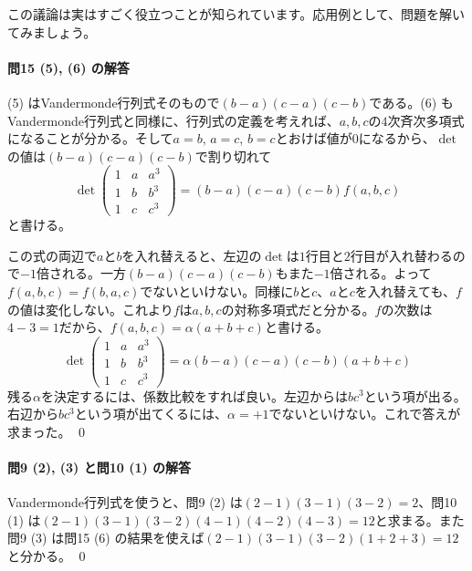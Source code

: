 この議論は実はすごく役立つことが知られています。応用例として、問題を解いてみましょう。

\paragraph{問15 (5), (6) の解答} (5) はVandermonde行列式そのもので$(b - a)(c - a)(c - b)$である。(6) もVandermonde行列式と同様に、行列式の定義を考えれば、$a, b, c$の$4$次斉次多項式になることが分かる。そして$a = b$, $a = c$, $b = c$とおけば値が$0$になるから、$\det$の値は$(b - a)(c - a)(c - b)$で割り切れて
\[
\det
\begin{pmatrix}
1 & a & a^3 \\
1 & b & b^3 \\
1 & c & c^3
\end{pmatrix}
= (b - a)(c - a)(c - b)f(a, b, c)
\]
と書ける。

この式の両辺で$a$と$b$を入れ替えると、左辺の$\det$は$1$行目と$2$行目が入れ替わるので$-1$倍される。一方$(b - a)(c - a)(c - b)$もまた$-1$倍される。よって$f(a, b, c) = f(b, a, c)$でないといけない。同様に$b$と$c$、$a$と$c$を入れ替えても、$f$の値は変化しない。これより$f$は$a, b, c$の対称多項式だと分かる。$f$の次数は$4 - 3 = 1$だから、$f(a, b, c) = \alpha (a + b + c)$と書ける。
\[
\det
\begin{pmatrix}
1 & a & a^3 \\
1 & b & b^3 \\
1 & c & c^3
\end{pmatrix}
= \alpha (b - a)(c - a)(c - b)(a + b + c)
\]
残る$\alpha$を決定するには、係数比較をすれば良い。左辺からは$bc^3$という項が出る。右辺から$bc^3$という項が出てくるには、$\alpha = +1$でないといけない。これで答えが求まった。 \qed

\paragraph{問9 (2), (3) と問10 (1) の解答}

Vandermonde行列式を使うと、問9 (2) は$(2 - 1)(3 - 1)(3 - 2) = 2$、問10 (1) は$(2 - 1)(3 - 1)(3 - 2)(4 - 1)(4 - 2)(4 - 3) = 12$と求まる。また問9 (3) は問15 (6) の結果を使えば$(2 - 1)(3 - 1)(3 - 2)(1 + 2 + 3) = 12$と分かる。 \qed

